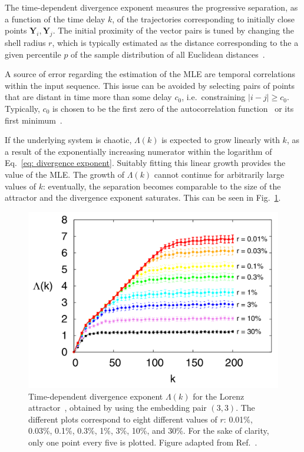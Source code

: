 The time-dependent divergence exponent
measures the progressive separation, as a function of the time delay $k$, of the trajectories corresponding
to initially close points $\mathbf{Y}_i,\mathbf{Y}_j$.
The initial proximity of the vector pairs is tuned by changing the shell
radius $r$, which is typically estimated as the distance corresponding to the a given percentile $p$ of the
sample distribution of all Euclidean distances~\cite{ref:franchi2014statistical,ref:ricci2020asymptotic}.

A source of error regarding the estimation of the MLE are temporal correlations within the input sequence.
This issue can be avoided by selecting pairs of points that are distant in time more than some delay
$c_0$, i.e.\ constraining $|i-j|\geq c_0$. Typically, $c_0$ is chosen to be the first zero of the
autocorrelation function~\cite{ref:theiler1986spurious} or its first minimum~\cite{ref:albano1995kolmogorov}.

If the underlying system is chaotic, $\Lambda(k)$ is expected to grow linearly with $k$,
as a result of the exponentially increasing numerator within the logarithm of Eq.~\ref{eq: divergence exponent}.
Suitably fitting this linear growth provides the value of the MLE\@. The growth
of $\Lambda(k)$ cannot continue for arbitrarily large values of $k$:
eventually, the separation becomes comparable to the size of the attractor
and the divergence exponent saturates.
This can be seen in Fig.~\ref{fig: lorenz divergence}.

\begin{figure}[!htbp]
\centering
\includegraphics[width=.6\linewidth]{images/lorenz_divergence.png}
\caption{
    Time-dependent divergence exponent $\Lambda(k)$ for the Lorenz attractor~\cite{lorenz1963deterministic},
    obtained by using the embedding pair
    $(3,3)$. The different plots correspond to eight different values of $r$:
    0.01\%, 0.03\%, 0.1\%, 0.3\%, 1\%, 3\%, 10\%, and 30\%. For the sake of
    clarity, only one point every five is plotted.
    Figure adapted from Ref.~\cite{ref:franchi2014statistical}.
}\label{fig: lorenz divergence}
\end{figure}


